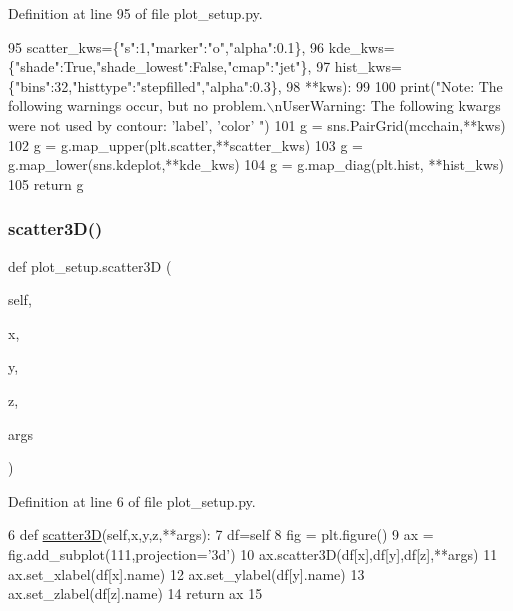 Definition at line 95 of file plot\+\_\+setup.\+py.


\begin{DoxyCode}
95     scatter\_kws=\{\textcolor{stringliteral}{"s"}:1,\textcolor{stringliteral}{"marker"}:\textcolor{stringliteral}{"o"},\textcolor{stringliteral}{"alpha"}:0.1\},
96     kde\_kws=\{\textcolor{stringliteral}{"shade"}:\textcolor{keyword}{True},\textcolor{stringliteral}{"shade\_lowest"}:\textcolor{keyword}{False},\textcolor{stringliteral}{"cmap"}:\textcolor{stringliteral}{"jet"}\},
97     hist\_kws=\{\textcolor{stringliteral}{"bins"}:32,\textcolor{stringliteral}{"histtype"}:\textcolor{stringliteral}{"stepfilled"},\textcolor{stringliteral}{"alpha"}:0.3\},
98     **kws):
99     
100     print(\textcolor{stringliteral}{"Note: The following warnings occur, but no problem.\(\backslash\)nUserWarning: The following kwargs were not
       used by contour: 'label', 'color' "})
101     g = sns.PairGrid(mcchain,**kws)
102     g = g.map\_upper(plt.scatter,**scatter\_kws)
103     g = g.map\_lower(sns.kdeplot,**kde\_kws)
104     g = g.map\_diag(plt.hist, **hist\_kws)
105     \textcolor{keywordflow}{return} g
\end{DoxyCode}
\mbox{\label{namespaceplot__setup_ae1d4aed021e4401e81d9dd0d242c7e2b}} 
\subsubsection{\texorpdfstring{scatter3\+D()}{scatter3D()}}
{\footnotesize\ttfamily def plot\+\_\+setup.\+scatter3D (\begin{DoxyParamCaption}\item[{}]{self,  }\item[{}]{x,  }\item[{}]{y,  }\item[{}]{z,  }\item[{}]{args }\end{DoxyParamCaption})}



Definition at line 6 of file plot\+\_\+setup.\+py.


\begin{DoxyCode}
6 \textcolor{keyword}{def }\hyperlink{namespaceplot__setup_ae1d4aed021e4401e81d9dd0d242c7e2b}{scatter3D}(self,x,y,z,**args):
7     df=self
8     fig = plt.figure()
9     ax = fig.add\_subplot(111,projection=\textcolor{stringliteral}{'3d'})
10     ax.scatter3D(df[x],df[y],df[z],**args)
11     ax.set\_xlabel(df[x].name)
12     ax.set\_ylabel(df[y].name)
13     ax.set\_zlabel(df[z].name)
14     \textcolor{keywordflow}{return} ax
15 
\end{DoxyCode}
\mbox{\label{namespaceplot__setup_a436a0609e4c2316379efdf45718260cb}} 

